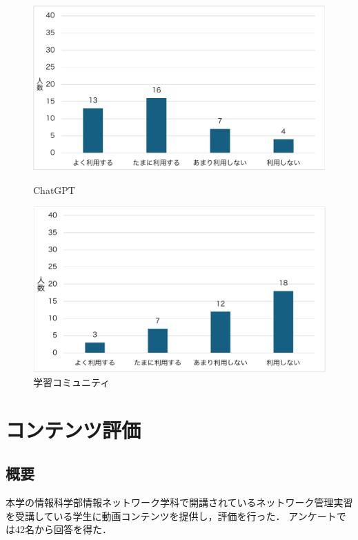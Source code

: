 \documentclass[12pt,a4j,titlepage]{ltjsarticle}
\begin{document}
\begin{figure}[!htb]
\centering
\begin{minipage}[b]{0.49\columnwidth}
    \centering
    \includegraphics[width=1.0\columnwidth]{ChatGPT.pdf}
    \caption{ChatGPT}
    \label{fig:ChatGPT2}
\end{minipage}
\begin{minipage}[b]{0.49\columnwidth}
    \centering
    \includegraphics[width=1.0\columnwidth]{学習コミュニティ.pdf}
    \caption{学習コミュニティ}
    \label{fig:community}
\end{minipage}
\end{figure}

\clearpage


\section{コンテンツ評価}
\subsection{概要}
本学の情報科学部情報ネットワーク学科で開講されているネットワーク管理実習を受講している学生に動画コンテンツを提供し，評価を行った．
アンケートでは42名から回答を得た．
\end{document}
